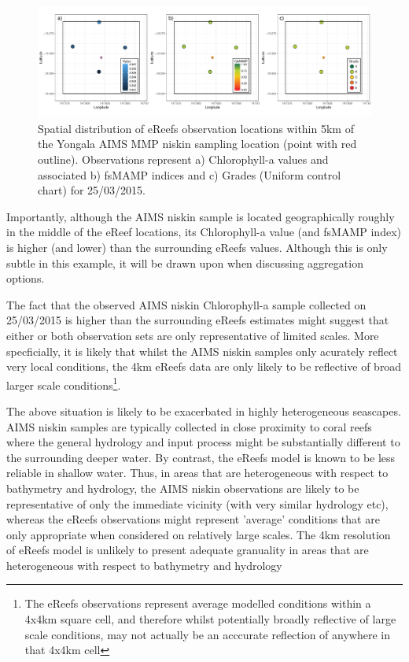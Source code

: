 \begin{figure}[!hptb]
  \includegraphics[width=\textwidth]{figures/FocalAreas/focalArea_Spatial.Yongala_Measure.chl.pdf}
    \caption[Spatial distribution of eReefs observation locations within 5km of the Yongala AIMS MMP niskin sampling location]{Spatial distribution of eReefs observation locations within 5km of the Yongala AIMS MMP niskin sampling location (point with red outline).  Observations represent a) Chlorophyll-a values and associated b) fsMAMP indices and c) Grades (Uniform control chart) for 25/03/2015.}\label{fig:focalArea_Spatial.Yongala_Measure.chl}
\end{figure}

Importantly, although the AIMS niskin sample is located geographically roughly in the middle of the
eReef locations, its Chlorophyll-a value (and fsMAMP index) is higher (and lower) than the surrounding
eReefs values.  Although this is only subtle in this example, it will be drawn upon when discussing
aggregation options.

The fact that the observed AIMS niskin Chlorophyll-a sample collected on 25/03/2015 is
higher than the surrounding eReefs estimates might suggest that either or both observation
sets are only representative of limited scales.  More specficially, it is likely that whilst the
AIMS niskin samples only acurately reflect very local conditions, the 4km eReefs data are
only likely to be reflective of broad larger scale conditions\footnote{The eReefs observations represent
  average modelled conditions within a 4x4km square cell, and therefore whilst potentially broadly reflective
  of large scale conditions, may not actually be an acccurate reflection of anywhere in that 4x4km cell}.

The above situation is likely to be exacerbated in highly heterogeneous seascapes.
AIMS niskin
samples are typically collected in close proximity to coral reefs where the general hydrology
and input process might be substantially different to the surrounding deeper water.  By contrast,
the eReefs model is known to be less reliable in shallow water.  Thus, in areas that are
heterogeneous with respect to bathymetry and hydrology, the AIMS niskin observations are
likely to be representative of only the immediate vicinity (with very similar hydrology etc),
whereas the eReefs observations might represent 'average' conditions that are only appropriate
when considered on relatively large scales. The 4km resolution of eReefs model is unlikely to present adequate granuality in areas that
are heterogeneous with respect to bathymetry and hydrology

